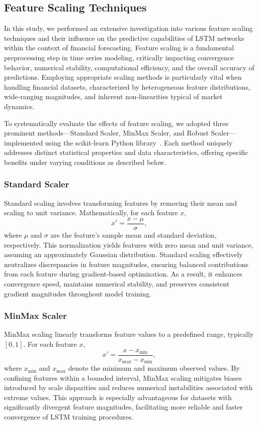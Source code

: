 \documentclass[letterpaper]{article}
\begin{document}
\subsection{Feature Scaling Techniques}

In this study, we performed an extensive investigation into various feature scaling techniques and their influence on the predictive capabilities of LSTM networks within the context of financial forecasting. Feature scaling is a fundamental preprocessing step in time series modeling, critically impacting convergence behavior, numerical stability, computational efficiency, and the overall accuracy of predictions. Employing appropriate scaling methods is particularly vital when handling financial datasets, characterized by heterogeneous feature distributions, wide‑ranging magnitudes, and inherent non‑linearities typical of market dynamics.

To systematically evaluate the effects of feature scaling, we adopted three prominent methods—Standard Scaler, MinMax Scaler, and Robust Scaler—implemented using the scikit‑learn Python library \cite{scikit-learn}. Each method uniquely addresses distinct statistical properties and data characteristics, offering specific benefits under varying conditions as described below.

\subsubsection{Standard Scaler}
Standard scaling involves transforming features by removing their mean and scaling to unit variance. Mathematically, for each feature \(x\),  
\[
x' = \frac{x - \mu}{\sigma},
\]
where \(\mu\) and \(\sigma\) are the feature’s sample mean and standard deviation, respectively. This normalization yields features with zero mean and unit variance, assuming an approximately Gaussian distribution. Standard scaling effectively neutralizes discrepancies in feature magnitudes, ensuring balanced contributions from each feature during gradient‑based optimization. As a result, it enhances convergence speed, maintains numerical stability, and preserves consistent gradient magnitudes throughout model training.

\subsubsection{MinMax Scaler}
MinMax scaling linearly transforms feature values to a predefined range, typically \([0,1]\). For each feature \(x\),  
\[
x' = \frac{x - x_{\min}}{x_{\max} - x_{\min}},
\]
where \(x_{\min}\) and \(x_{\max}\) denote the minimum and maximum observed values. By confining features within a bounded interval, MinMax scaling mitigates biases introduced by scale disparities and reduces numerical instabilities associated with extreme values. This approach is especially advantageous for datasets with significantly divergent feature magnitudes, facilitating more reliable and faster convergence of LSTM training procedures.
\end{document}
